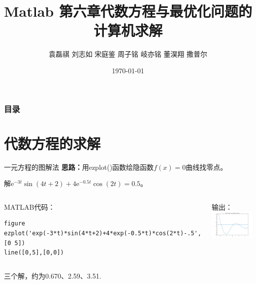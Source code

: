 \documentclass[10pt]{beamer}
\title{Matlab 第六章\quad 代数方程与最优化问题的计算机求解}
\author{\footnotesize 袁磊祺 \quad 刘志如 \quad 宋庭鉴  \quad 周子铭 \quad 岐亦铭 \quad 董淏翔 \quad  撒普尔}
\date{\today}
\begin{document}
  
  \maketitle
  \begin{frame}
		\frametitle{目录}
		\tableofcontents{}
\end{frame}



\section{代数方程的求解}
\begin{frame}[fragile]{一元方程的图解法}
		  	\textbf{思路：}用ezplot()函数绘隐函数$f(x)=0$曲线找零点。
			 \begin{example}[6-1]
				解$\mathrm{e}^{-3 t} \sin (4 t+2)+4 \mathrm{e}^{-0.5 t} \cos (2 t)=0.5$。

		  	\begin{columns}[T]
			  	\begin{block}{MATLAB代码：}
    \begin{lstlisting}
figure
ezplot('exp(-3*t)*sin(4*t+2)+4*exp(-0.5*t)*cos(2*t)-.5',[0 5])
line([0,5],[0,0])
    \end{lstlisting}	
			\end{block}	  		
				\begin{block}{输出：}
					\centering
					\includegraphics[width=\textwidth]{11}
				 \end{block}
		  	\end{columns}
三个解，约为0.670、2.59、3.51.
		\end{example}
\end{frame}
\end{document}
